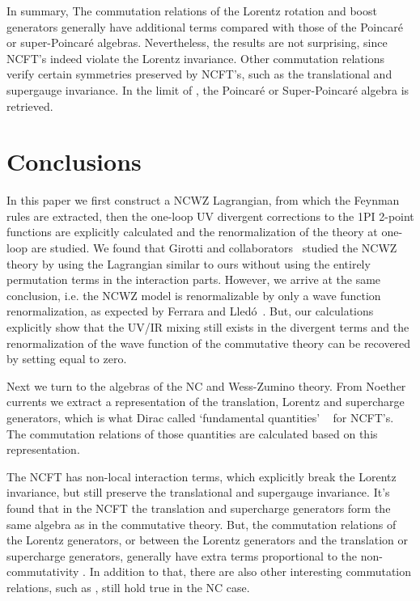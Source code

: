 \documentclass[a4paper,a4paper]{article}
\begin{document}
In summary,  The commutation relations of the Lorentz
rotation and boost generators generally have additional terms 
compared with those of the Poincar\'{e} or super-Poincar\'{e} algebras. 
Nevertheless, the results are not surprising, since NCFT's 
indeed violate the Lorentz invariance. Other commutation relations
verify certain symmetries preserved by NCFT's, such as 
the translational and supergauge invariance. In the limit of 
\coordHE{}, the Poincar\'{e} or Super-Poincar\'{e} algebra is retrieved.


\section{Conclusions} 
In this paper we first construct a NCWZ Lagrangian, 
from which the Feynman rules are extracted, then the one-loop UV divergent corrections  
to the 1PI 2-point functions are explicitly calculated and the renormalization of the 
theory at one-loop are studied. 
We found that Girotti and collaborators~\cite{GGRS} studied the NCWZ 
theory by using the Lagrangian similar to ours without using the 
entirely permutation terms in the interaction parts. However, we arrive at the same 
conclusion, i.e. the NCWZ model is renormalizable by only 
a wave function renormalization, as expected by Ferrara and Lled\'{o}~\cite{FL}. 
But, our calculations explicitly show that 
the UV/IR mixing still exists in the divergent terms and the renormalization of the wave 
function of the commutative theory can be recovered by setting \myHighlight{$\Theta^{\mu\nu}$}\coordHE{} equal to zero. 

Next we turn to the algebras of the NC \coordHE{} and 
Wess-Zumino theory. From Noether currents we extract a representation of 
the translation, Lorentz and supercharge generators, 
which is what Dirac called `fundamental quantities'
~\cite{Dirac} for NCFT's. The commutation relations of those
quantities are calculated based on this representation. 

The NCFT has non-local interaction terms,
which explicitly break the Lorentz invariance, but still preserve the translational and
supergauge invariance. It's found that in the NCFT the translation 
and supercharge generators form the same algebra as in the commutative theory. 
But, the commutation relations of the Lorentz generators, or between 
the Lorentz generators and the translation or supercharge generators, generally 
have extra terms proportional to the non-commutativity \myHighlight{$\Theta^{\mu\nu}$}\coordHE{}. 
In addition to that, there are also other 
interesting commutation relations, such as \coordHE{}, 
still hold true in the NC case. 
\end{document}
